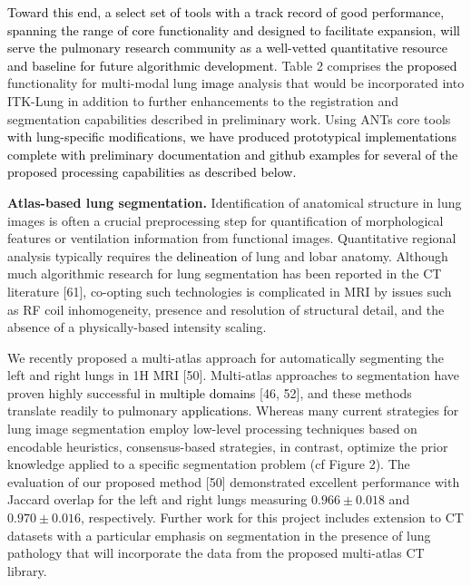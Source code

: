 \documentclass[11pt,]{article}
\begin{document}
\textcolor{black}{
Toward this end, a select set of tools with a track record of good performance, spanning
the range of core functionality and designed to facilitate expansion, will serve the
pulmonary research community
as a well-vetted quantitative resource and baseline for future algorithmic development.}
Table 2 comprises \textcolor{black}{the proposed} functionality for
multi-modal lung \textcolor{black}{image} analysis that would be
incorporated into ITK-Lung in addition to further enhancements to the
registration and segmentation capabilities described in preliminary
work. Using ANTs core tools
\textcolor{black}{with lung-specific modifications,
we have produced prototypical implementations complete with preliminary documentation
and github examples for several of the proposed processing capabilities as described
below.}

\textbf{Atlas-based lung segmentation.} Identification of anatomical
structure in lung images is often a crucial preprocessing step for
quantification of morphological features or ventilation information from
functional images. Quantitative regional analysis typically requires the
\textcolor{black}{delineation} of lung and lobar anatomy. Although much
algorithmic research for lung segmentation has been reported in the CT
literature {[}61{]}, co-opting such technologies is complicated in MRI
by issues such as RF coil inhomogeneity, presence and resolution of
structural detail, and the absence of a physically-based intensity
scaling.

We recently proposed a multi-atlas approach for automatically segmenting
the left and right lungs in 1H MRI {[}50{]}. Multi-atlas approaches to
segmentation have proven highly successful in
\textcolor{black}{multiple domains} {[}46, 52{]}, and these methods
translate readily to pulmonary \textcolor{black}{applications}. Whereas
many current strategies for lung image segmentation employ low-level
processing techniques based on encodable heuristics, consensus-based
strategies, in contrast, optimize the prior knowledge applied to a
specific segmentation problem (cf Figure 2). The evaluation of our
proposed method {[}50{]} demonstrated excellent performance with Jaccard
overlap for the left and right lungs measuring \(0.966\pm0.018\) and
\(0.970\pm0.016\), respectively. Further work for this project includes
extension to CT datasets with a particular emphasis on segmentation in
the presence of lung pathology that will incorporate the data from the
proposed multi-atlas CT library.


\end{document}
